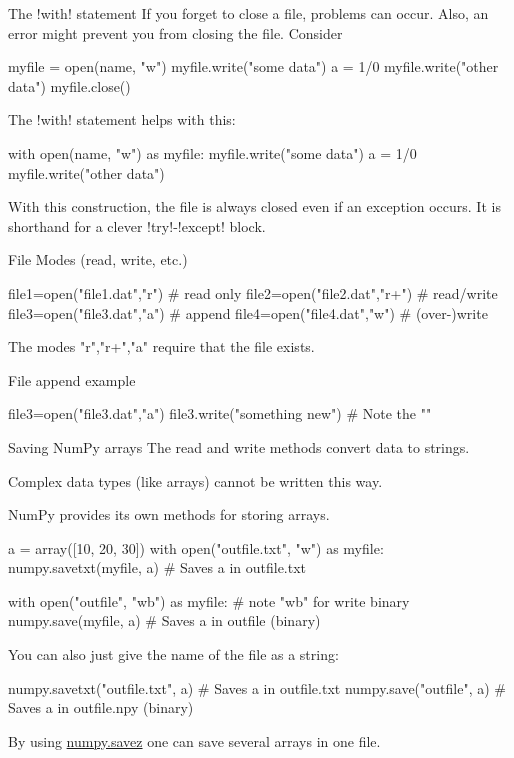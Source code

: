 \documentclass[hyperref={pdfpagelabels=false},table]{beamer}
\begin{document}
\begin{frame}[fragile]{The \pyth!with! statement}
If you forget to close a file, problems can occur. 
Also, an error might prevent you from closing the file. Consider
\begin{python}
myfile = open(name, "w")
myfile.write("some data")
a = 1/0
myfile.write("other data")
myfile.close()
\end{python}
The \pyth!with! statement helps with this:
\begin{python}
with open(name, "w") as myfile:
  myfile.write("some data")
  a = 1/0
  myfile.write("other data")
\end{python}
With this construction, the file is always closed even if an exception occurs. It is shorthand for a clever \pyth!try!-\pyth!except! block.
\end{frame}

\begin{frame}[fragile]{File Modes (read, write, etc.)}
 \begin{python}
   file1=open("file1.dat","r")  # read only
   file2=open("file2.dat","r+") # read/write
   file3=open("file3.dat","a")  # append
   file4=open("file4.dat","w")  # (over-)write
 \end{python}

The modes "r","r+","a" require that the file exists.
\begin{exampleblock}{File append example}
\begin{python}
  file3=open("file3.dat","a")
  file3.write("something new\n") # Note the "\n"
\end{python}
\end{exampleblock}
\end{frame}




\begin{frame}[fragile]{Saving NumPy arrays}
The read and write methods convert data to strings.

Complex data types (like arrays) cannot be written this way.

NumPy provides its own methods for storing arrays.
\begin{python}
a = array([10, 20, 30])
with open("outfile.txt", "w") as myfile:
  numpy.savetxt(myfile, a)  # Saves a in outfile.txt

with open("outfile", "wb") as myfile: # note "wb" for write binary
  numpy.save(myfile, a)  # Saves a in outfile (binary)
\end{python}

You can also just give the name of the file as a string:
\begin{python}
numpy.savetxt("outfile.txt", a)
# Saves a in outfile.txt
numpy.save("outfile", a) 
# Saves a in outfile.npy (binary)
\end{python}
  By using
  \href{https://numpy.org/doc/stable/reference/generated/numpy.savez.html}{numpy.savez}
  one can save several arrays in one file.
\end{frame}
\end{document}
